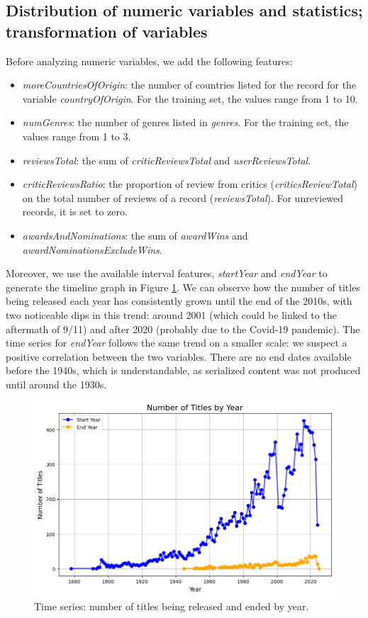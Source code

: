 \subsection{Distribution of numeric variables and statistics; transformation of variables}
\label{numeric_vars_analysis}
Before analyzing numeric variables, we add the following features:
\begin{itemize}
    \item \textit{moreCountriesOfOrigin}: the number of countries listed for the record for the variable \textit{countryOfOrigin}. For the training set, the values range from 1 to 10.
    \item \textit{numGenres}: the number of genres listed in \textit{genres}. For the training set, the values range from 1 to 3.
    \item \textit{reviewsTotal}: the sum of \textit{criticReviewsTotal} and \textit{userReviewsTotal}.
    \item \textit{criticReviewsRatio}: the proportion of review from critics (\textit{criticsReviewTotal}) on the total number of reviews of a record (\textit{reviewsTotal}). For unreviewed records, it is set to zero.
    \item \textit{awardsAndNominations}: the sum of \textit{awardWins} and \textit{awardNominationsExcludeWins}.
\end{itemize}

Moreover, we use the available interval features, \textit{startYear} and \textit{endYear} to generate the timeline graph in Figure \ref{fig:timeline_graph.png}. We can observe how the number of titles being released each year has consistently grown until the end of the 2010s, with two noticeable dips in this trend: around 2001 (which could be linked to the aftermath of 9/11) and after 2020 (probably due to the Covid-19 pandemic). The time series for \textit{endYear} follows the same trend on a smaller scale: we suspect a positive correlation between the two variables. There are no end dates available before the 1940s, which is understandable, as serialized content was not produced until around the 1930s. 

\begin{figure}
    \includegraphics[width=\columnwidth]{../../results/images/timeline_graph.png}
    \caption{Time series: number of titles being released and ended by year.}
    \label{fig:timeline_graph.png}
\end{figure}

